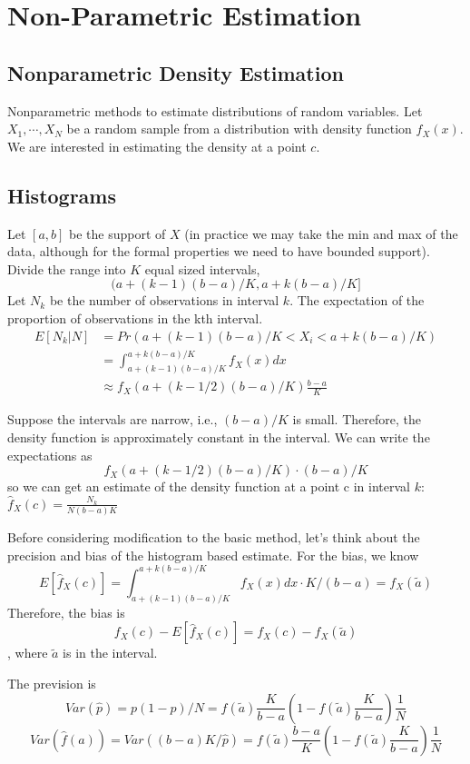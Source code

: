 \documentclass[11pt, a4paper, oneside]{article}
\theoremstyle{definition}
\theoremstyle{proposition}
\theoremstyle{corollary}
\theoremstyle{lemma}
\theoremstyle{theorem}
\begin{document}
\section{Non-Parametric Estimation}
\subsection{Nonparametric Density Estimation}
Nonparametric methods to estimate distributions of random variables. Let $X_1, \cdots, X_N$ be a random sample from a distribution with density function $f_X(x)$. We are interested in estimating the density at a point $c$. 

\subsection{Histograms}
Let $[a, b]$ be the support of $X$ (in practice we may take the min and max of the data, although for the formal properties we need to have bounded support). Divide the range into $K$ equal sized intervals,
$$(a+(k-1)(b-a)/K, a+k(b - a)/K]$$  
Let $N_k$ be the number of observations in interval $k$. The expectation of the proportion of observations in the kth interval. 
\begin{align*}
E[N_k|N] &= Pr(a +(k-1)(b-a)/K<X_i< a+k(b-a)/K)\\
&=\int_{a+(k-1)(b-a)/K}^{a+k(b-a)/K} f_X(x)dx \\
&\approx f_X(a+(k-1/2)(b-a)/K)\frac{b -a}{K}
\end{align*}

Suppose the intervals are narrow, i.e., $(b-a)/K$ is small. Therefore, the density function is approximately constant in the interval. We can write the expectations as $$f_X(a+(k-1/2)(b -a)/K)\cdot(b-a)/K$$ so we can get an estimate of the density function at a point c in interval $k$: $\hat{f}_X(c) = \frac{N_k}{N(b-a)K}$ 

Before considering modification to the basic method, let's think about the precision and bias of the histogram based estimate. For the bias, we know 
$$E[\hat{f}_X(c)] = \int_{a+(k-1)(b-a)/K}^{a+k(b -a)/K} f_X(x)dx \cdot K/(b-a) = f_X(\tilde{a})$$ Therefore, the bias is $$f_X(c) - E[\hat{f}_X(c)] = f_X(c) - f_X(\tilde{a})$$, where $\tilde{a}$ is in the interval. 

The prevision is
$$Var(\hat{p}) =p(1- p)/N = f(\tilde{a})\frac{K}{b-a}(1- f(\tilde{a})\frac{K}{b -a})\frac{1}{N}$$
$$Var(\hat{f}(a)) = Var((b-a)K/\hat{p}) = f(\tilde{a})\frac{b -a}{K}(1- f(\tilde{a})\frac{K}{b-a})\frac{1}{N}$$
\end{document}
